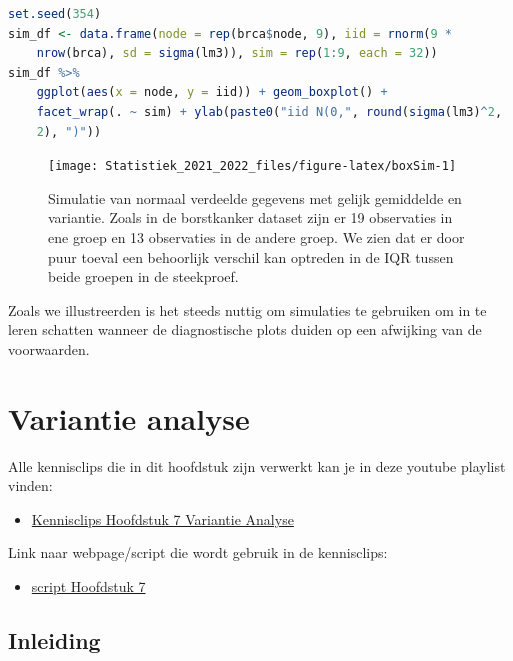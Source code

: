 \documentclass[
  12pt,dutch,coursenotes]{book}
\providecommand{\tightlist}{%
  \setlength{\itemsep}{0pt}\setlength{\parskip}{0pt}}
\theoremstyle{definition}
\theoremstyle{definition}
\theoremstyle{definition}
\theoremstyle{definition}
\theoremstyle{remark}
\begin{document}
\begin{lstlisting}[language=R]
set.seed(354)
sim_df <- data.frame(node = rep(brca$node, 9), iid = rnorm(9 *
    nrow(brca), sd = sigma(lm3)), sim = rep(1:9, each = 32))
sim_df %>%
    ggplot(aes(x = node, y = iid)) + geom_boxplot() +
    facet_wrap(. ~ sim) + ylab(paste0("iid N(0,", round(sigma(lm3)^2,
    2), ")"))
\end{lstlisting}

\begin{figure}

{\centering \texttt{[image: Statistiek\_2021\_2022\_files/figure-latex/boxSim-1]} 

}

\caption{Simulatie van normaal verdeelde gegevens met gelijk gemiddelde en variantie. Zoals in de borstkanker dataset zijn er 19 observaties in ene groep en 13 observaties in de andere groep. We zien dat er door puur toeval een behoorlijk verschil kan optreden in de IQR tussen beide groepen in de steekproef.}\label{fig:boxSim}
\end{figure}

Zoals we illustreerden is het steeds nuttig om simulaties te gebruiken om in te leren schatten wanneer de diagnostische plots duiden op een afwijking van de voorwaarden.

\hypertarget{chap-anova}{%
\chapter{Variantie analyse}\label{chap-anova}}

Alle kennisclips die in dit hoofdstuk zijn verwerkt kan je in deze youtube playlist vinden:

\begin{itemize}
\tightlist
\item
  \href{https://www.youtube.com/playlist?list=PLZH1hP8_LbJIBVGNQ61zxMgc2srezPpnB}{Kennisclips Hoofdstuk 7 Variantie Analyse}
\end{itemize}

Link naar webpage/script die wordt gebruik in de kennisclips:

\begin{itemize}
\tightlist
\item
  \href{https://statomics.github.io/sbc21/rmd/07-Anova.html}{script Hoofdstuk 7}
\end{itemize}

\hypertarget{inleiding-6}{%
\section{Inleiding}\label{inleiding-6}}
\end{document}
